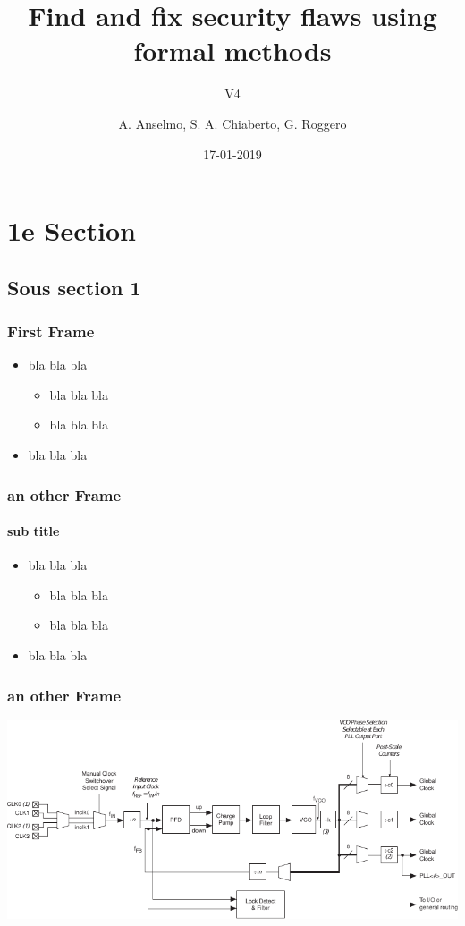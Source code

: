 \documentclass{beamer}
\title{Find and fix security flaws using formal methods}
\subtitle{V4}
\author{A. Anselmo, S. A. Chiaberto, G. Roggero}
\institute{EURECOM}
\date{17-01-2019}
\begin{document}
\maketitle

\section[1e] { 1e Section }
\subsection[1su] { Sous section 1}
\begin{frame}
\frametitle{First Frame}

\begin{itemize}
\item bla bla bla
  \begin{itemize}
    \item bla bla bla
    \item bla bla bla
  \end{itemize}
\item bla bla bla
\end{itemize}

\end{frame}
\begin{frame}
\frametitle{an other Frame}
\framesubtitle{sub title}

\begin{itemize}
\item bla bla bla
  \begin{itemize}
    \item bla bla bla
    \item bla bla bla
  \end{itemize}
\item bla bla bla
\end{itemize}

\end{frame}
\begin{frame}
\frametitle{an other Frame}

\begin{center}
  \includegraphics[width=\textwidth]{cycii_PLL}
\end{center}

\end{frame}
\end{document}
